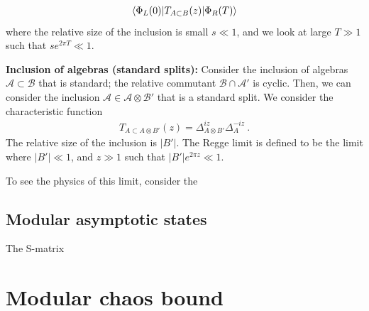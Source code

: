 \documentclass[a4paper,11pt]{article}
\theoremstyle{definition}
\newcommand{\mA}{\mathcal{A}}
\newcommand{\mB}{\mathcal{B}}
\begin{document}
\begin{eqnarray}
\braket{\Phi_L(0)| T_{A\subset B}(z)|\Phi_R(T)}
\end{eqnarray}
where the relative size of the inclusion is small $s\ll 1$, and we look at large $T\gg 1$ such that $s e^{2\pi T}\ll 1$. 



{\bf Inclusion of algebras (standard splits):} Consider the inclusion of algebras $\mA\subset \mB$ that is standard; the relative commutant $\mB\cap \mA'$ is cyclic. Then, we can consider the inclusion $\mA\in \mA\otimes \mB'$ that is a standard split. We consider the characteristic function 
\begin{eqnarray}
    T_{A\subset A\otimes B'}(z)=\Delta_{A\otimes B'}^{iz}\Delta_A^{-iz}\ .
\end{eqnarray}
The relative size of the inclusion is $|B'|$. The Regge limit is defined to be the limit where $|B'|\ll 1$, and $z\gg 1$ such that $|B'| e^{2\pi z}\ll 1$.





To see the physics of this limit, consider the 



\subsection{Modular asymptotic states}

The S-matrix 



\section{Modular chaos bound}
\end{document}

